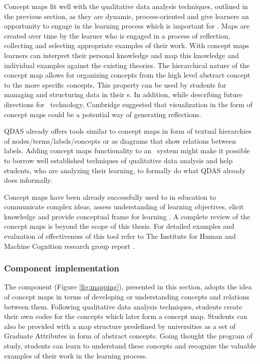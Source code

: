 Concept maps fit well with the qualitative data analysis techniques, outlined in
the previous section, as they are dynamic, process-oriented and give learners an
opportunity to engage in the learning process \citep{Mcaleese1998} which is
important for \LLLs \citep{Schuetze2006,Divjak2004}. Maps are created over time
by the learner who is engaged in a process of reflection, collecting and
selecting appropriate examples of their work. With concept maps learners can
interpret their personal knowledge and map this knowledge and individual
examples against the existing theories. The hierarchical nature of the concept
map allows for organizing concepts from the high level abstract concept to the
more specific concepts. This property can be used by students for managing and
structuring data in their \ep s. In addition, while describing future directions
for \ep~technology, Cambridge \citeyearpar{Cambridge2010} suggested that
visualization in the form of concept maps could be a potential way of generating
reflections.

QDAS already offers tools similar to concept maps in form of textual hierarchies
of nodes/terms/labels/concepts or as diagrams that show relations between
labels. Adding concept maps functionality to an \ep~system might make it
possible to borrow well established techniques of qualitative data analysis and
help students, who are analyzing their learning, to formally do what QDAS
already does informally. 

Concept maps have been already successfully used to in education to communicate
complex ideas, assess understanding of learning objectives, elicit knowledge and
provide conceptual frame for learning \citep{Novak2010}. A complete review of
the concept maps is beyond the scope of this thesis. For detailed examples and
evaluation of effectiveness of this tool refer to The Institute for Human and
Machine Cognition research group report \citep{Canas2003}.

\subsubsection{Component implementation}

The component (Figure \ref{fig:mapping}), presented in this section, adopts the
idea of concept maps in terms of developing or understanding concepts and
relations between them. Following qualitative data analysis techniques, students
create their own codes for the concepts which later form a concept map. Students
can also be provided with a map structure predefined by universities as a set of
Graduate Attributes in form of abstract concepts. Going thought the program of
study, students can learn to understand these concepts and recognize the
valuable examples of their work in the learning process.

